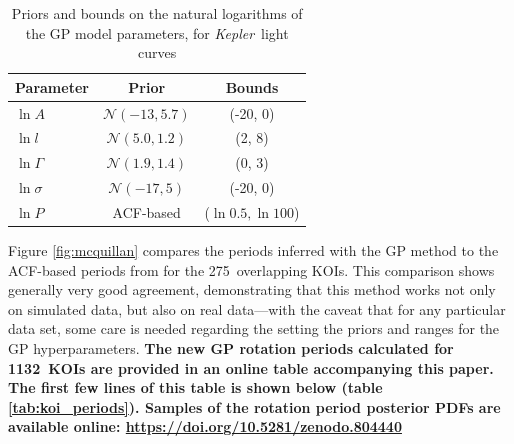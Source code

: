\documentclass[a4paper,fleqn,usenatbib,useAMS]{mnras}
\newcommand{\Kepler}{{\it Kepler}}
\newcommand{\nkoi}{1132}
\newcommand{\nkoimcq}{275}
\begin{document}
\begin{table}
\begin{center}
\caption{Priors and bounds on the natural logarithms of the GP model parameters,
        for \Kepler\ light curves}
\begin{tabular}{lcc}
Parameter & Prior & Bounds\\
    \hline
    $\ln A$ & $\mathcal N(-13, 5.7)$ & (-20, 0) \\
    $\ln l$ & $\mathcal N(5.0, 1.2)$ & (2, 8) \\
    $\ln \Gamma$ & $\mathcal N(1.9, 1.4)$ & (0, 3) \\
    $\ln \sigma$ & $\mathcal N(-17, 5)$ & (-20, 0) \\
    $\ln P $ & ACF-based & ($\ln 0.5, \ln 100$) \\
\end{tabular}
\end{center}
\end{table}
\label{tab:koipriors}

Figure \ref{fig:mcquillan} compares the periods inferred with the GP method to
the ACF-based periods from \citet{Mcquillan2013} for the \nkoimcq\ overlapping
KOIs.
This comparison shows generally very good agreement, demonstrating that this
method works not only on simulated data, but also on real data---with the
caveat that for any particular data set, some care is needed regarding the
setting the priors and ranges for the GP hyperparameters.
{\bf The new GP rotation periods calculated for \nkoi\ KOIs are provided in an
online table accompanying this paper.
The first few lines of this table is shown below
(table \ref{tab:koi_periods}).
Samples of the rotation period posterior PDFs are available online:
\url{https://doi.org/10.5281/zenodo.804440}}
\end{document}
